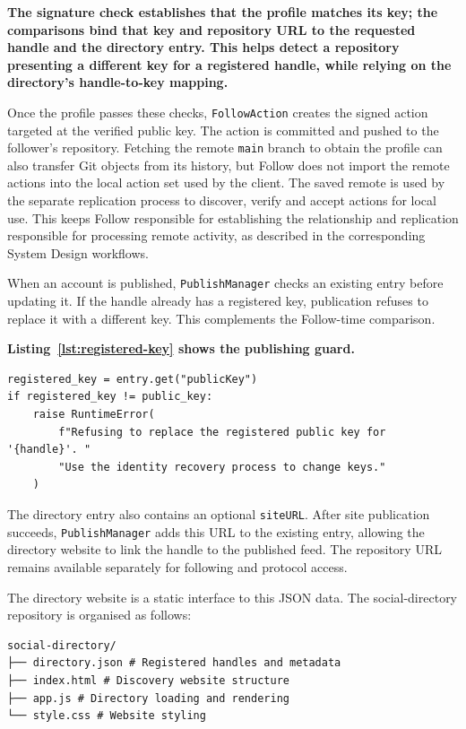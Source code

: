 \textbf{The signature check establishes that the profile matches its key;
the comparisons bind that key and repository URL to the requested handle and
the directory entry. This helps detect a repository presenting a different
key for a registered handle, while relying on the directory's handle-to-key
mapping.}

Once the profile passes these checks, \texttt{FollowAction} creates
the signed action targeted at the verified public key. The action is
committed and pushed to the follower's repository. Fetching the remote
\texttt{main} branch to obtain the profile can also transfer Git objects from
its history, but Follow does not import the remote actions into the local
action set used by the client. The saved remote is used by the separate
replication process to discover, verify and accept actions for local use.
This keeps Follow responsible for establishing the relationship and
replication responsible for processing remote activity, as described in the
corresponding System Design workflows.

When an account is published,
\texttt{PublishManager} checks an existing entry before updating it. If the
handle already has a registered key, publication refuses to replace it with
a different key. This complements the Follow-time comparison.

\textbf{Listing~\ref{lst:registered-key} shows the publishing guard.}
\begin{lstlisting}[caption={Preventing replacement of a registered key},label={lst:registered-key}]
registered_key = entry.get("publicKey")
if registered_key != public_key:
    raise RuntimeError(
        f"Refusing to replace the registered public key for '{handle}'. "
        "Use the identity recovery process to change keys."
    )
\end{lstlisting}

The directory entry also contains an optional \texttt{siteURL}.
After site publication succeeds, \texttt{PublishManager} adds this URL to
the existing entry, allowing the directory website to link the handle to
the published feed. The repository URL remains available separately for
following and protocol access.

The directory website is a static interface to this JSON data. The social-directory repository is organised as follows: 
\begin{verbatim} 
social-directory/ 
├── directory.json # Registered handles and metadata 
├── index.html # Discovery website structure 
├── app.js # Directory loading and rendering 
└── style.css # Website styling 
\end{verbatim}

